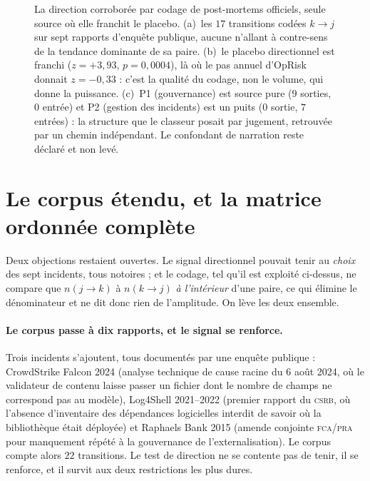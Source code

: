 \begin{figure}[htbp]
  \centering
  \caption{La direction corroborée par codage de post-mortems
officiels, seule source où elle franchit le placebo. (a)~les $17$ transitions codées
$k\to j$ sur sept rapports d'enquête publique, aucune n'allant à contre-sens de la tendance
dominante de sa paire. (b)~le placebo directionnel est franchi ($z=+3{,}93$,
$p=0{,}0004$), là où le pas annuel d'OpRisk donnait $z=-0{,}33$ : c'est la qualité du codage,
non le volume, qui donne la puissance. (c)~P1 (gouvernance) est source pure ($9$
sorties, $0$ entrée) et P2 (gestion des incidents) est un puits ($0$ sortie, $7$ entrées) : la
structure que le classeur posait par jugement, retrouvée par un chemin indépendant. Le
confondant de narration reste déclaré et non levé.}
  \label{fig:postmortem}
\end{figure}

\section{Le corpus étendu, et la matrice ordonnée complète}
\label{sec:corpus-etendu}

Deux objections restaient ouvertes. Le signal directionnel pouvait tenir au \emph{choix} des
sept incidents, tous notoires ; et le codage, tel qu'il est exploité ci-dessus, ne compare que
$n(j\to k)$ à $n(k\to j)$ \emph{à l'intérieur} d'une paire, ce qui élimine le dénominateur et
ne dit donc rien de l'amplitude. On lève les deux ensemble.

\paragraph{Le corpus passe à dix rapports, et le signal se renforce.} Trois incidents
s'ajoutent, tous documentés par une enquête publique : CrowdStrike Falcon 2024
(analyse technique de cause racine du 6 août 2024, où le validateur de contenu laisse passer un
fichier dont le nombre de champs ne correspond pas au modèle), Log4Shell 2021--2022
(premier rapport du \textsc{csrb}, où l'absence d'inventaire des dépendances logicielles
interdit de savoir où la bibliothèque était déployée) et Raphaels Bank 2015 (amende
conjointe \textsc{fca}/\textsc{pra} pour manquement répété à la gouvernance de
l'externalisation). Le corpus compte alors $22$ transitions. Le test de direction ne se contente
pas de tenir, il se renforce, et il survit aux deux restrictions les plus dures.


